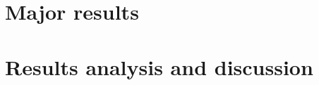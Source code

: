 

\section{Major results}
    \label{sec:major_results}
    

\section{Results analysis and discussion}
    \label{sec:results_analysis_discussion}
    